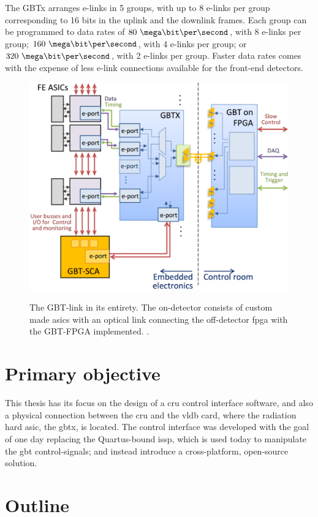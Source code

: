 \documentclass[main.tex]{subfiles}
\begin{document}
The GBTx arranges e-links in 5 groups, with up to 8 e-links per group corresponding to 16 bits in the uplink and the downlink frames. Each group can be programmed to data rates of $80~\mega\bit\per\second$, with 8 e-links per group; $160~\mega\bit\per\second$, with 4 e-links per group; or $320~\mega\bit\per\second$, with 2 e-links per group. Faster data rates comes with the expense of less e-link connections available for the front-end detectors.

\begin{figure} %
\includegraphics[width=0.7\linewidth]{../img/gbtsys}  \\[0.1 cm]
\caption{The GBT-link in its entirety. The on-detector consists of custom made \glspl{asic} with an optical link connecting the off-detector \gls{fpga} with the GBT-FPGA implemented. \cite[Figure 1]{gbtscapres14}.}
\label{fig:gbtsys}
\end{figure}

\section{Primary objective}
This thesis has its focus on the design of a \gls{cru} control interface software, and also a physical connection between the \gls{cru} and the \gls{vldb} card, where the radiation hard \gls{asic}, the \gls{gbt}x, is located. The control interface was developed with the goal of one day replacing the Quartus-bound \gls{issp}, which is used today to manipulate the \gls{gbt} control-signals; and instead introduce a cross-platform, open-source solution. 

\section{Outline}
\end{document}
